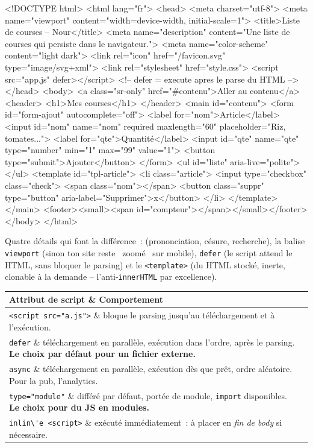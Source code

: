 \documentclass[12pt,a4paper,twoside,openright]{book}
\makeatletter
\providecommand{\cmd}[1]{}%
\renewcommand{\cmd}[1]{\srcbox{\texttt{\detokenize{#1}}}}
\newenvironment{tabz}[1]{\rowcolors{2}{white}{tralight}%
  \small\setlength{\tabcolsep}{5pt}\setlength{\LTpre}{3pt}\setlength{\LTpost}{3pt}%
  \begin{longtable}{@{}#1@{}}\toprule}
  {\bottomrule\end{longtable}\normalfont\setlength{\tabcolsep}{6pt}}
\newcommand{\thd}[1]{\textbf{\color{white}#1}}
\newcommand{\headrow}{\rowcolor{theadbg}}
\makeatother
\begin{document}
\begin{codeplain}
<!DOCTYPE html>
<html lang="fr">
<head>
  <meta charset="utf-8">
  <meta name="viewport" content="width=device-width, initial-scale=1">
  <title>Liste de courses -- Nour</title>
  <meta name="description" content="Une liste de courses qui persiste dans le navigateur.">
  <meta name="color-scheme" content="light dark">
  <link rel="icon" href="/favicon.svg" type="image/svg+xml">
  <link rel="stylesheet" href="style.css">
  <script src="app.js" defer></script>            <!-- defer = execute apres le parse du HTML -->
</head>
<body>
  <a class="sr-only" href="#contenu">Aller au contenu</a>
  <header>
    <h1>Mes courses</h1>
  </header>
  <main id="contenu">
    <form id="form-ajout" autocomplete="off">
      <label for="nom">Article</label>
      <input id="nom" name="nom" required maxlength="60" placeholder="Riz, tomates...">
      <label for="qte">Quantit\'e</label>
      <input id="qte" name="qte" type="number" min="1" max="99" value="1">
      <button type="submit">Ajouter</button>
    </form>
    <ul id="liste" aria-live="polite"></ul>
    <template id="tpl-article">
      <li class="article">
        <input type="checkbox" class="check">
        <span class="nom"></span>
        <button class="suppr" type="button" aria-label="Supprimer">x</button>
      </li>
    </template>
  </main>
  <footer><small><span id="compteur"></span></small></footer>
</body>
</html>
\end{codeplain}

Quatre d\'etails qui font la diff\'erence~: \cmd{lang="fr"} (prononciation, c\'esure, recherche),
la balise \verb|viewport| (sinon ton site reste \og ~zoom\'e~ \fg{} sur mobile), \verb|defer|
(le script attend le HTML, sans bloquer le parsing) et le \verb|<template>| (du HTML stock\'e,
inerte, clonable \`a la demande -- l'anti-\verb|innerHTML| par excellence).

\begin{tabz}{lX}
  \headrow \thd{Attribut de script} \& \thd{Comportement} \\
  \midrule
  \verb|<script src="a.js">| \& bloque le parsing jusqu'au t\'el\'echargement et \`a l'ex\'ecution. \\
  \verb|defer| \& t\'el\'echargement en parall\`ele, ex\'ecution dans l'ordre, apr\`es le parsing. \textbf{Le choix par d\'efaut pour un fichier externe.} \\
  \verb|async| \& t\'el\'echargement en parall\`ele, ex\'ecution d\`es que pr\^et, ordre al\'eatoire. Pour la pub, l'analytics. \\
  \verb|type="module"| \& diff\'er\'e par d\'efaut, port\'ee de module, \verb|import| disponibles. \textbf{Le choix pour du JS en modules.} \\
  \verb|inlin\'e <script>| \& ex\'ecut\'e imm\'ediatement~: \`a placer en \emph{fin de body} si n\'ecessaire. \\
\end{tabz}
\end{document}
